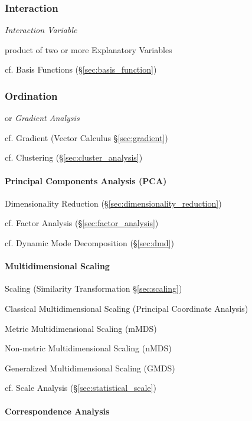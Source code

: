 \subsubsection{Interaction}\label{sec:interaction}

\emph{Interaction Variable}

product of two or more Explanatory Variables

cf. Basis Functions (\S\ref{sec:basis_function})



\subsubsection{Ordination}\label{sec:ordination}

or \emph{Gradient Analysis}

cf. Gradient (Vector Calculus \S\ref{sec:gradient})

cf. Clustering (\S\ref{sec:cluster_analysis})



\paragraph{Principal Components Analysis (PCA)}\label{sec:pca}\hfill

Dimensionality Reduction (\S\ref{sec:dimensionality_reduction})

cf. Factor Analysis (\S\ref{sec:factor_analysis})

cf. Dynamic Mode Decomposition (\S\ref{sec:dmd})



\paragraph{Multidimensional Scaling}\label{sec:multidimensional_scaling}\hfill

\fist Scaling (Similarity Transformation \S\ref{sec:scaling})

Classical Multidimensional Scaling (Principal Coordinate Analysis)

Metric Multidimensional Scaling (mMDS)

Non-metric Multidimensional Scaling (nMDS)

Generalized Multidimensional Scaling (GMDS)

cf. Scale Analysis (\S\ref{sec:statistical_scale})



\paragraph{Correspondence Analysis}\label{sec:correspondence_analysis}\hfill

